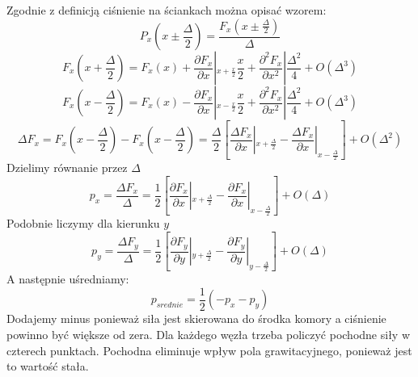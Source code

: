 \documentclass[12pt, letterpaper]{report}
\begin{document}
    Zgodnie z definicją ciśnienie na ściankach można opisać wzorem:
    \begin{equation}
        P_x (x \pm \frac{\Delta}{2}) = \frac{F_x (x \pm \frac{\Delta}{2})}{\Delta}
    \end{equation}
    \begin{equation}
        F_x (x + \frac{\Delta}{2}) = F_x (x) + \frac{\partial F_x}{\partial x} 
        \left| _{x + \frac{x}{2}}  \frac{x}{2} + \frac{\partial^2 F_x}{\partial x^2 }  \right| \frac{\Delta^2}{4} + O(\Delta^3)
    \end{equation}
    \begin{equation}
        F_x (x - \frac{\Delta}{2}) = F_x (x) - \frac{\partial F_x}{\partial x} 
        \left| _{x - \frac{x}{2}}  \frac{x}{2} + \frac{\partial^2 F_x}{\partial x^2 }  \right| \frac{\Delta^2}{4} + O(\Delta^3)
    \end{equation} 
    \begin{equation}
        \Delta F_x = 
        F_x (x - \frac{\Delta}{2}) - F_x (x - \frac{\Delta}{2}) = 
        \frac{\Delta}{2} \left[ \frac{\Delta F_x}{\partial x} |_{x + \frac{\Delta}{2}}  -
          \frac{\Delta F_x}{\partial x}|_{x - \frac{\Delta}{2}} \right] + O(\Delta^2)
    \end{equation}
    Dzielimy równanie przez $\Delta$
    \begin{equation}
        p_x = \frac{\Delta F_x}{\Delta} = \frac{1}{2} 
        \left[ \frac{\partial F_x}{\partial x} |_{x + \frac{\Delta}{2}} - \frac{\partial F_x}{\partial x} |_{x - \frac{\Delta}{2}} \right] + O(\Delta)
    \end{equation}
    Podobnie liczymy dla kierunku $y$
    \begin{equation}
        p_y = \frac{\Delta F_y}{\Delta} = \frac{1}{2} 
        \left[ \frac{\partial F_y}{\partial y} |_{y + \frac{\Delta}{2}} - \frac{\partial F_y}{\partial y} |_{y - \frac{\Delta}{2}} \right] + O(\Delta)
    \end{equation}
    A następnie uśredniamy:
    \begin{equation}
        p_{srednie} = \frac{1}{2} \left( -p_x - p_y \right)
    \end{equation}
    Dodajemy minus ponieważ siła jest skierowana do środka komory a ciśnienie powinno być większe od zera. 
    Dla każdego węzła trzeba policzyć pochodne siły w czterech punktach. 
    Pochodna eliminuje wpływ pola grawitacyjnego, ponieważ jest to wartość stała.
\end{document}
